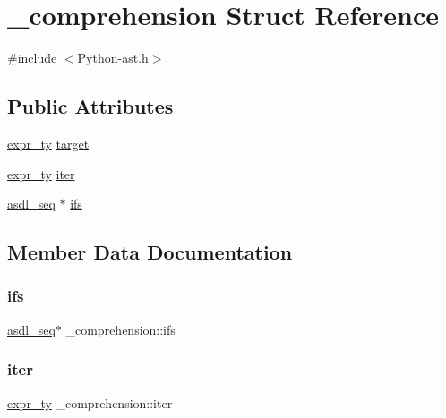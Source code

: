 \hypertarget{struct__comprehension}{}\section{\+\_\+comprehension Struct Reference}
\label{struct__comprehension}


{\ttfamily \#include $<$Python-\/ast.\+h$>$}

\subsection*{Public Attributes}
\begin{DoxyCompactItemize}
\item 
\mbox{\hyperlink{_python-ast_8h_a56d3705e020a071405094a220c4592bd}{expr\+\_\+ty}} \mbox{\hyperlink{struct__comprehension_a810b2152a85f7ba984e54207d59d8124}{target}}
\item 
\mbox{\hyperlink{_python-ast_8h_a56d3705e020a071405094a220c4592bd}{expr\+\_\+ty}} \mbox{\hyperlink{struct__comprehension_ab351ea193dabc5c156b6c571f7f80681}{iter}}
\item 
\mbox{\hyperlink{structasdl__seq}{asdl\+\_\+seq}} $\ast$ \mbox{\hyperlink{struct__comprehension_abe4e5448c7e19c25ced95cf7027df493}{ifs}}
\end{DoxyCompactItemize}


\subsection{Member Data Documentation}
\mbox{\label{struct__comprehension_abe4e5448c7e19c25ced95cf7027df493}} 
\subsubsection{\texorpdfstring{ifs}{ifs}}
{\footnotesize\ttfamily \mbox{\hyperlink{structasdl__seq}{asdl\+\_\+seq}}$\ast$ \+\_\+comprehension\+::ifs}

\mbox{\label{struct__comprehension_ab351ea193dabc5c156b6c571f7f80681}} 
\subsubsection{\texorpdfstring{iter}{iter}}
{\footnotesize\ttfamily \mbox{\hyperlink{_python-ast_8h_a56d3705e020a071405094a220c4592bd}{expr\+\_\+ty}} \+\_\+comprehension\+::iter}

